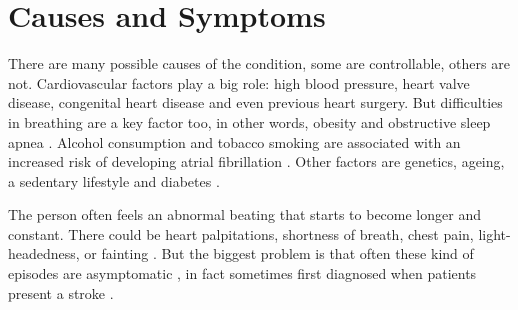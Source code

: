 \section{Causes and Symptoms}
There are many possible causes of the condition, some are controllable, others are not. Cardiovascular factors play a big role: high blood pressure, heart valve disease, congenital heart disease and even previous heart surgery. But difficulties in breathing are a key factor too, in other words, obesity and obstructive sleep apnea \cite{doi:10.1111/obr.12056}. Alcohol consumption and tobacco smoking are associated with an increased risk of developing atrial fibrillation \cite{Tonelo2013, DU20171968}. Other factors are genetics, ageing, a sedentary lifestyle and diabetes \cite{10.1001/jama.291.23.2851, Staerk2017}.

The person often feels an abnormal beating that starts to become longer and constant. There could be heart palpitations, shortness of breath, chest pain,  light-headedness, or fainting \cite{chamberlain_gray_houghton_2010}. But the biggest problem is that often these kind of episodes are asymptomatic \cite{Munger2014}, in fact sometimes first diagnosed when patients present a stroke \cite{page2003asymptomatic}.

